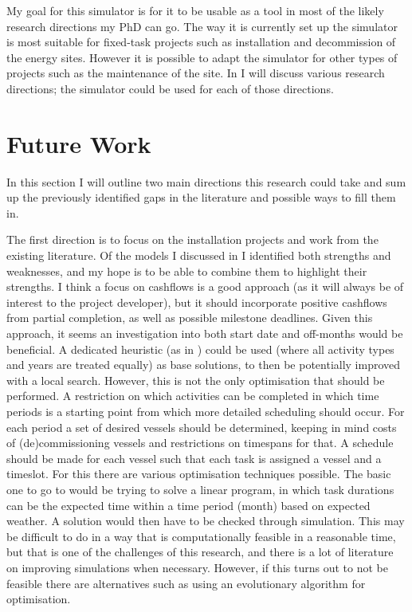 \documentclass[a4paper,12pt]{article}
\begin{document}
My goal for this simulator is for it to be usable as a tool in most of the likely research directions my PhD can go. The way it is currently set up the simulator is most suitable for fixed-task projects such as installation and decommission of the energy sites. However it is possible to adapt the simulator for other types of projects such as the maintenance of the site. In  I will discuss various research directions; the simulator could be used for each of those directions. 

\pagebreak

\section{Future Work} \label{s:concl}
In this section I will outline two main directions this research could take and sum up the previously identified gaps in the literature and possible ways to fill them in. 

\bigskip

The first direction is to focus on the installation projects and work from the existing literature. Of the models I discussed in  I identified both strengths and weaknesses, and my hope is to be able to combine them to highlight their strengths. I think a focus on cashflows is a good approach (as it will always be of interest to the project developer), but it should incorporate positive cashflows from partial completion, as well as possible milestone deadlines. Given this approach, it seems an investigation into both start date and off-months would be beneficial. A dedicated heuristic (as in \cite{kerkhove2017optimised}) could be used (where all activity types and years are treated equally) as base solutions, to then be potentially improved with a local search. However, this is not the only optimisation that should be performed. A restriction on which activities can be completed in which time periods is a starting point from which more detailed scheduling should occur. For each period a set of desired vessels should be determined, keeping in mind costs of (de)commissioning vessels and restrictions on timespans for that. A schedule should be made for each vessel such that each task is assigned a vessel and a timeslot. For this there are various optimisation techniques possible. The basic one to go to would be trying to solve a linear program, in which task durations can be the expected time within a time period (month) based on expected weather. A solution would then have to be checked through simulation. This may be difficult to do in a way that is computationally feasible in a reasonable time, but that is one of the challenges of this research, and there is a lot of literature on improving simulations when necessary. However, if this turns out to not be feasible there are alternatives such as using an evolutionary algorithm for optimisation. 
\end{document}
